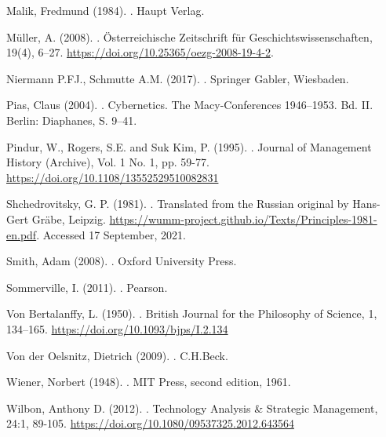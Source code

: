 \documentclass[a4paper,12pt]{article}
\begin{document}
\begin{thebibliography}{xxx}
 Malik, Fredmund (1984).  .  \newblock Haupt Verlag.

 Müller, A. (2008).  .  \newblock Österreichische Zeitschrift für
  Geschichtswissenschaften, 19(4), 6–27.  \newblock
  \url{https://doi.org/10.25365/oezg-2008-19-4-2}.

 Niermann P.FJ., Schmutte A.M. (2017).  .  \newblock Springer Gabler, Wiesbaden.

 Pias, Claus (2004).  .  \newblock Cybernetics. The Macy-Conferences
  1946–1953. Bd. II. Berlin: Diaphanes, S. 9–41.

 Pindur, W., Rogers, S.E. and Suk Kim, P. (1995).
  .  \newblock
  Journal of Management History (Archive), Vol. 1 No. 1, pp. 59-77.  \newblock
  \url{https://doi.org/10.1108/13552529510082831}

 Shchedrovitsky, G. P. (1981).  .  \newblock Translated from the
  Russian original by Hans-Gert Gräbe, Leipzig.  \newblock
  \url{https://wumm-project.github.io/Texts/Principles-1981-en.pdf}.
  \newblock Accessed 17 September, 2021.

 Smith, Adam (2008).  .  \newblock Oxford University
  Press.

 Sommerville, I. (2011).  .  \newblock Pearson.

 Von Bertalanffy, L. (1950).  .  \newblock British Journal for the
  Philosophy of Science, 1, 134–165.  \newblock
  \url{https://doi.org/10.1093/bjps/I.2.134}

 Von der Oelsnitz, Dietrich (2009).  .  \newblock C.H.Beck.

 Wiener, Norbert (1948).  .  \newblock MIT
  Press, second edition, 1961.

 Wilbon, Anthony D. (2012).  .  \newblock Technology Analysis \& Strategic Management, 24:1,
  89-105.  \newblock \url{https://doi.org/10.1080/09537325.2012.643564}
\end{thebibliography}
\end{document}
